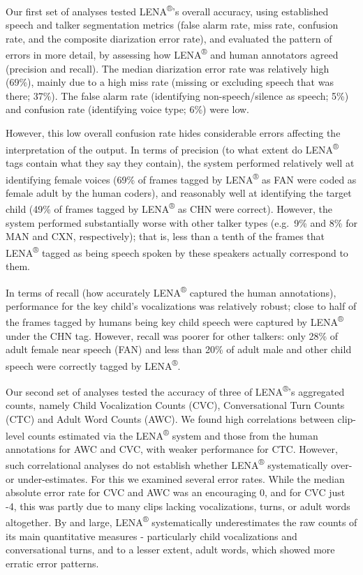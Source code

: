 \documentclass[english,table,man,floatsintext]{apa6}
\begin{document}
Our first set of analyses tested LENA\textsuperscript{®}'s overall accuracy, using established speech and talker segmentation metrics (false alarm rate, miss rate, confusion rate, and the composite diarization error rate), and evaluated the pattern of errors in more detail, by assessing how LENA\textsuperscript{®} and human annotators agreed (precision and recall). The median diarization error rate was relatively high (69\%), mainly due to a high miss rate (missing or excluding speech that was there; 37\%). The false alarm rate (identifying non-speech/silence as speech; 5\%) and confusion rate (identifying voice type; 6\%) were low.

However, this low overall confusion rate hides considerable errors affecting the interpretation of the output. In terms of precision (to what extent do LENA\textsuperscript{®} tags contain what they say they contain), the system performed relatively well at identifying female voices (69\% of frames tagged by LENA\textsuperscript{®} as FAN were coded as female adult by the human coders), and reasonably well at identifying the target child (49\% of frames tagged by LENA\textsuperscript{®} as CHN were correct). However, the system performed substantially worse with other talker types (e.g.~9\% and 8\% for MAN and CXN, respectively); that is, less than a tenth of the frames that LENA\textsuperscript{®} tagged as being speech spoken by these speakers actually correspond to them.

In terms of recall (how accurately LENA\textsuperscript{®} captured the human annotations), performance for the key child's vocalizations was relatively robust; close to half of the frames tagged by humans being key child speech were captured by LENA\textsuperscript{®} under the CHN tag. However, recall was poorer for other talkers: only 28\% of adult female near speech (FAN) and less than 20\% of adult male and other child speech were correctly tagged by LENA\textsuperscript{®}.

Our second set of analyses tested the accuracy of three of LENA\textsuperscript{®}'s aggregated counts, namely Child Vocalization Counts (CVC), Conversational Turn Counts (CTC) and Adult Word Counts (AWC). We found high correlations between clip-level counts estimated via the LENA\textsuperscript{®} system and those from the human annotations for AWC and CVC, with weaker performance for CTC. However, such correlational analyses do not establish whether LENA\textsuperscript{®} systematically over- or under-estimates. For this we examined several error rates. While the median absolute error rate for CVC and AWC was an encouraging 0, and for CVC just -4, this was partly due to many clips lacking vocalizations, turns, or adult words altogether. By and large, LENA\textsuperscript{®} systematically underestimates the raw counts of its main quantitative measures - particularly child vocalizations and conversational turns, and to a lesser extent, adult words, which showed more erratic error patterns.
\end{document}
